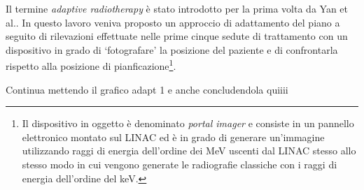 Il termine \textit{adaptive radiotherapy} è stato introdotto per la prima volta  da Yan et al.\cite{Yan1996}. In questo lavoro veniva proposto un approccio di adattamento del piano a seguito di rilevazioni effettuate nelle prime cinque sedute di trattamento con un dispositivo in grado di `fotografare' la posizione del paziente e di confrontarla rispetto alla posizione di pianficazione\footnote{Il dispositivo in oggetto è denominato \textit{portal imager} e consiste in un pannello elettronico montato sul LINAC ed è in grado di generare un'immagine utilizzando raggi di energia dell'ordine dei MeV uscenti dal LINAC stesso allo stesso modo in cui vengono generate le radiografie classiche con i raggi di energia dell'ordine del keV.}.

Continua mettendo il grafico adapt 1 e anche concludendola quiiii










